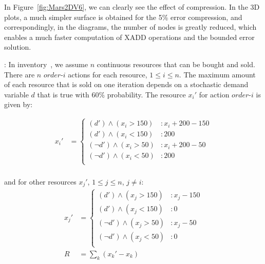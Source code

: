 In Figure~\ref{fig:Mars2DV6}, we can clearly see the effect of compression. In the 3D plots, a much simpler surface is obtained for the 5\% error compression, and correspondingly, in the diagrams, the number of nodes is greatly reduced, which enables a much faster computation of XADD operations and the bounded error solution. 

\Invent:
In inventory~\cite{Scarf2002}, we assume $n$
continuous resources that can be bought and sold. There are $n$
$order$-$i$ actions for each resource, $ 1 \leq i \leq
n$. The maximum amount of each resource that is sold on one iteration
depends on a stochastic demand variable $d$ that is true with $60\%$
probability. The resource $x_i'$ for action $order$-$i$ is given by:

\vspace{-7mm}
{\footnotesize
\begin{align*}
x_i' & = \begin{cases} 
(d') \wedge (x_i > 150) &: x_i + 200 - 150\\
(d') \wedge (x_i < 150) &:  200\\
(\neg d') \wedge (x_i > 50) &: x_i + 200 - 50\\
(\neg d') \wedge (x_i < 50) &:  200\\
\end{cases} \\
\end{align*} }
\vspace{-13mm}

and for other resources $x_j'$, $1 \leq j \leq n$, $j\neq i$:\\

\vspace{-10mm}
{\footnotesize
\begin{align*}
x_j' & = \begin{cases} 
(d') \wedge (x_j > 150) &: x_j - 150\\
(d') \wedge (x_j < 150) &:  0\\
(\neg d') \wedge (x_j > 50) &: x_j - 50\\
(\neg d') \wedge (x_j < 50) &:  0\\
\end{cases} \\
R & = \sum_{k} {(x_k' - x_k)}\\
\end{align*} }
\vspace{-12mm}

